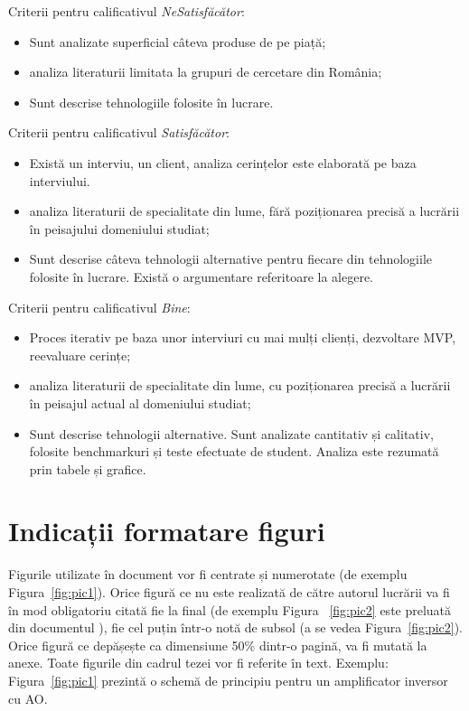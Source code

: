 \documentclass[12pt,a4paper]{report}
\newcommand{\worktype}[1]{[\textit{#1}] }
\newcommand{\dezvoltare}{\worktype{Dezvoltare de produs}}
\newcommand{\cercetare}{\worktype{Cercetare}}
\newcommand{\ambele}{\worktype{Ambele}}
\begin{document}
Criterii pentru calificativul \textit{Ne\textit{Satisfăcător}}:
\begin{itemize}
	\item \dezvoltare Sunt analizate superficial câteva produse de pe piață;
	\item \cercetare analiza literaturii limitata la grupuri de cercetare din România;
	\item \ambele Sunt descrise tehnologiile folosite în lucrare.
\end{itemize}

Criterii pentru calificativul \textit{Satisfăcător}:
\begin{itemize}
	\item \dezvoltare Există un interviu, un client, analiza cerințelor este elaborată pe baza interviului.
	\item \cercetare analiza literaturii de specialitate din lume, fără poziționarea precisă a lucrării în peisajului domeniului studiat;
	\item \ambele Sunt descrise câteva tehnologii alternative pentru fiecare din tehnologiile folosite în lucrare. Există o argumentare referitoare la alegere.
\end{itemize}

Criterii pentru calificativul \textit{Bine}:
\begin{itemize}
	\item \dezvoltare Proces iterativ pe baza unor interviuri cu mai mulți clienți, dezvoltare MVP, reevaluare cerințe;
	\item \cercetare analiza literaturii de specialitate din lume, cu poziționarea precisă a lucrării în peisajul actual al domeniului studiat;
	\item \ambele Sunt descrise tehnologii alternative. Sunt analizate cantitativ și calitativ, folosite benchmarkuri și teste efectuate de student. Analiza este rezumată prin tabele și grafice.
\end{itemize}

\section{Indicații formatare figuri}

Figurile utilizate în document vor fi centrate și numerotate (de exemplu Figura~\ref{fig:pic1}).
Orice figură ce nu este realizată de către autorul lucrării va fi în mod obligatoriu citată fie la final (de exemplu Figura ~\ref{fig:pic2} este preluată din documentul \cite{article}), fie cel puțin într-o notă de subsol (a se vedea Figura~\ref{fig:pic2}). Orice figură ce depășește ca dimensiune 50\% dintr-o pagină, va fi mutată la anexe. Toate figurile din cadrul tezei vor fi referite în text. Exemplu: Figura~\ref{fig:pic1} prezintă o schemă de principiu pentru un amplificator inversor cu AO.
\end{document}
